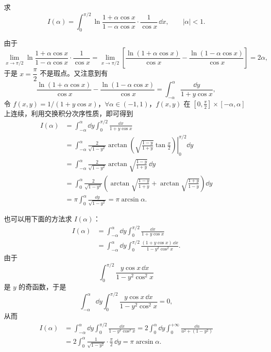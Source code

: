 \begin{xexample}[23.1.4]
求
\[
  I(\alpha)=\int_0^{\pi/2}\ln\frac{1+\alpha\cos x}{1-\alpha\cos x}\cdot\frac{1}{\cos x}\,\dd x,
  \qquad |\alpha|<1.
\]
\end{xexample}
\begin{xsolution}
由于
\[
  \lim_{x\to\pi/2}\ln\frac{1+\alpha\cos x}{1-\alpha\cos x}\cdot\frac1{\cos x}
  =\lim_{x\to\pi/2}\left[
  \frac{\ln(1+\alpha\cos x)}{\cos x}
  -\frac{\ln(1-\alpha\cos x)}{\cos x}\right]=2\alpha,
\]
于是 $x=\dfrac\pi2$ 不是瑕点。又注意到有
\[
  \frac{\ln(1+\alpha\cos x)}{\cos x}
  -\frac{\ln(1-\alpha\cos x)}{\cos x}
  =\int_{-\alpha}^{\alpha}\frac{\dd y}{1+y\cos x},
\]
令 $f(x,y)=1/(1+y\cos x)$，$\forall\alpha\in(-1,1)$，$f(x,y)$ 在 $[0,\frac\pi2]\times[-\alpha,\alpha]$ 上连续，利用交换积分次序性质，即可得到
\[
\begin{aligned}
  I(\alpha)
  &=\int_{-\alpha}^{\alpha}\dd y\int_0^{\pi/2}\frac{\dd x}{1+y\cos x}\\
  &=\int_{-\alpha}^{\alpha}\frac{2}{\sqrt{1-y^2}}
  \left.\arctan\left(\sqrt{\frac{1-y}{1+y}}\tan\frac{x}{2}\right)\right|_0^{\pi/2}\dd y\\
  &=\int_{-\alpha}^{\alpha}\frac{2}{\sqrt{1-y^2}}
  \arctan\sqrt{\frac{1-y}{1+y}}\,\dd y\\
  &=\int_0^\alpha\frac{2}{\sqrt{1-y^2}}
  \left(\arctan\sqrt{\frac{1-y}{1+y}}+\arctan\sqrt{\frac{1+y}{1-y}}\right)\dd y\\
  &=\pi\int_0^\alpha\frac{\dd y}{\sqrt{1-y^2}}=\pi\arcsin\alpha.
\end{aligned}
\]
\end{xsolution}

\begin{xremark}
也可以用下面的方法求 $I(\alpha)$：
\[
\begin{aligned}
  I(\alpha)
  &=\int_{-\alpha}^{\alpha}\dd y\int_0^{\pi/2}\frac{\dd x}{1+y\cos x}\\
  &=\int_{-\alpha}^{\alpha}\dd y\int_0^{\pi/2}
  \frac{(1+y\cos x)\,\dd x}{1-y^2\cos^2x}.
\end{aligned}
\]
由于
\[
  \int_0^{\pi/2}\frac{y\cos x\,\dd x}{1-y^2\cos^2x}
\]
是 $y$ 的奇函数，于是
\[
  \int_{-\alpha}^{\alpha}\dd y\int_0^{\pi/2}
  \frac{y\cos x\,\dd x}{1-y^2\cos^2x}=0,
\]
从而
\[
\begin{aligned}
  I(\alpha)
  &=\int_{-\alpha}^{\alpha}\dd y\int_0^{\pi/2}
  \frac{\dd x}{1-y^2\cos^2x}
  =2\int_0^\alpha\dd y\int_0^{+\infty}\frac{\dd u}{u^2+(1-y^2)}\\
  &=2\int_0^\alpha\frac{1}{\sqrt{1-y^2}}\cdot\frac\pi2\,\dd y
  =\pi\arcsin\alpha.
\end{aligned}
\]
\end{xremark}

